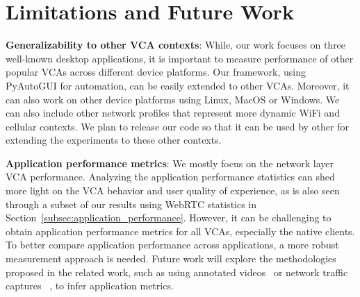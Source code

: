 \section{Limitations and Future Work}
\label{sec:discussion}

\textbf{Generalizability to other VCA contexts}: While, our work focuses on three well-known desktop applications, it is important to measure performance of other popular VCAs across different device platforms. Our framework, using PyAutoGUI for automation, can be easily extended to other VCAs. Moreover, it can also work on other device platforms using Linux, MacOS or Windows. We can also include other network profiles that represent more dynamic WiFi and cellular contexts. We plan to release our code so that it can be used by other for extending the experiments to these other contexts.


\textbf{Application performance metrics}: We mostly focus on the network layer VCA performance. Analyzing the application performance statistics can shed more light on the VCA behavior and user quality of experience, as is also seen through a subset of our results using WebRTC statistics in Section~\ref{subsec:application_performance}. However, it can be challenging to obtain application performance metrics for all VCAs, especially the native clients. To better compare application performance across applications, a more robust measurement approach is needed. Future work will explore the methodologies proposed in the related work, such as using annotated videos~\cite{xu2012video} or network traffic captures ~\cite{dasari2018scalable}, to infer application metrics.


